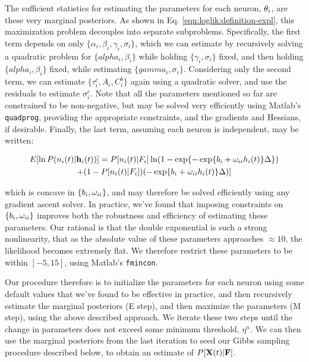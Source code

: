 The sufficient statistics for estimating the parameters for each neuron, $\mathbf{\theta}_i$, are these very marginal posteriors.  As shown in Eq. \eqref{eqn:loglik:definition-expl}, this maximization problem decouples into separate subproblems.  Specifically, the first term depends on only $\{\alpha_i, \beta_i, \gamma_i, \sigma_i\}$, which we can estimate by recursively solving a quadratic problem for $\{alpha_i, \beta_i\}$ while holding $\{\gamma_i, \sigma_i\}$ fixed, and then holding $\{alpha_i, \beta_i\}$ fixed, while estimating $\{gamma_i,\sigma_i\}$.  Considering only the second term, we can estimate $\{\tau_i^c, A_i, C_i^b\}$ again using a quadratic solver, and use the residuals to estimate $\sigma_i^c$.  Note that all the parameters mentioned so far are constrained to be non-negative, but may be solved very efficiently using Matlab's \texttt{quadprog}, providing the appropriate constraints, and the gradients and Hessians, if desirable.  Finally, the last term, assuming each neuron is independent, may be written:

\begin{multline}
	E [\ln P(n_i(t) | \mathbf{h}_i(t))] = P[n_i(t) | F_i] \ln (1-\exp\{-\exp\{b_i + \omega_{ii} h_i(t)\}\Delta\})
	\\ +  (1-P[n_i(t) | F_i]) (-\exp\{b_i + \omega_{ii} h_i(t)\}\Delta)] 
\end{multline}

\noindent which is concave in $\{b_i, \omega_{ii}\}$, and may therefore be solved efficiently using any gradient ascent solver. In practice, we've found that imposing constraints on $\{b_i, \omega_{ii}\}$ improves both the robustness and efficiency of estimating these parameters.  Our rational is that the double exponential is such a strong nonlinearity, that as the absolute value of these parameters approaches $\approx 10$, the likelihood becomes extremely flat.  We therefore restrict these parameters to be within $[-5,15]$, using Matlab's \texttt{fmincon}.

Our procedure therefore is to initialize the parameters for each neuron using some default values that we've found to be effective in practice, and then recursively estimate the marginal posteriors (E step), and then maximize the parameters (M step), using the above described approach.  We iterate these two steps until the change in parameters does not exceed some minimum threshold, $\eta^n$.  We can then use the marginal posteriors from the last iteration to seed our Gibbs sampling procedure described below, to obtain an estimate of $P[{\bf X}(t) | {\bf F}]$.